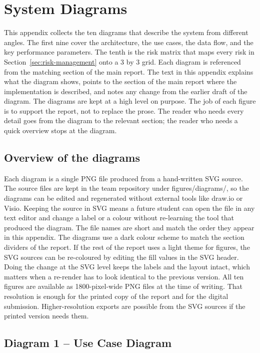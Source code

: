\section{System Diagrams}
\label{app:system-diagrams}

This appendix collects the ten diagrams that describe the system from different angles. The first nine
cover the architecture, the use cases, the data flow, and the key performance parameters. The tenth is
the risk matrix that maps every risk in Section~\ref{sec:risk-management} onto a 3 by 3 grid.
Each diagram is referenced from the matching section of the main report. The text in this appendix
explains what the diagram shows, points to the section of the main report where the implementation
is described, and notes any change from the earlier draft of the diagram.
The diagrams are kept at a high level on purpose. The job of each figure is to support the report, not to
replace the prose. The reader who needs every detail goes from the diagram to the relevant section;
the reader who needs a quick overview stops at the diagram.


\subsection{Overview of the diagrams}
\label{app:diagram-overview}

Each diagram is a single PNG file produced from a hand-written SVG source. The source files are kept in
the team repository under figures/diagrams/, so the diagrams can be edited and regenerated without
external tools like draw.io or Visio. Keeping the source in SVG means a future student can open the file
in any text editor and change a label or a colour without re-learning the tool that produced the
diagram. The file names are short and match the order they appear in this appendix.
The diagrams use a dark colour scheme to match the section dividers of the report. If the rest of the
report uses a light theme for figures, the SVG sources can be re-coloured by editing the fill values in the
SVG header. Doing the change at the SVG level keeps the labels and the layout intact, which matters
when a re-render has to look identical to the previous version.
All ten figures are available as 1800-pixel-wide PNG files at the time of writing. That resolution is
enough for the printed copy of the report and for the digital submission. Higher-resolution exports are
possible from the SVG sources if the printed version needs them.


\subsection{Diagram 1 -- Use Case Diagram}
\label{app:use-case-diagram}

